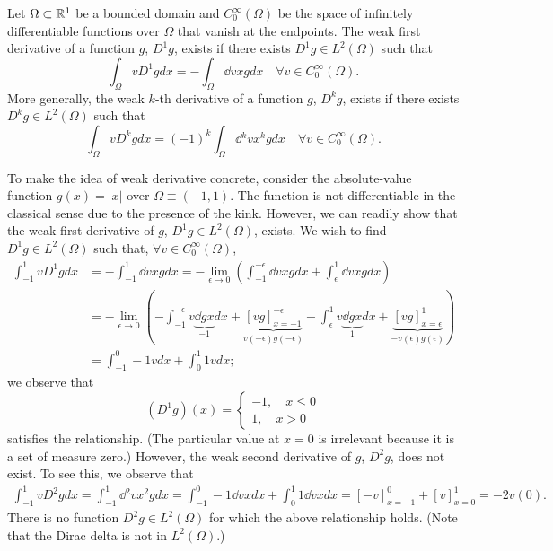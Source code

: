 \begin{definition}
  Let $\Omega \subset \mathbb{R}^1$ be a bounded domain and $C^\infty_0(\Omega)$ be the space of infinitely differentiable functions over $\Omega$ that vanish at the endpoints. The weak first derivative of a function $g$, $D^1g$, exists if there exists $D^1g \in L^2(\Omega)$ such that
\begin{equation*}
  \int_\Omega v D^1 g dx = - \int_\Omega \dd{v}{x} g dx \quad \forall v \in C^\infty_0(\Omega).
\end{equation*}
More generally, the weak $k$-th derivative of a function $g$, $D^kg$, exists if there exists $D^kg \in L^2(\Omega)$ such that
\begin{equation*}
  \int_\Omega v D^k g dx = (-1)^k \int_\Omega \dd{^kv}{x^k} g dx \quad \forall v \in C^\infty_0(\Omega).
\end{equation*}
\end{definition}

To make the idea of weak derivative concrete, consider the absolute-value function $g(x) = |x|$ over $\Omega \equiv (-1,1)$.  The function is not differentiable in the classical sense due to the presence of the kink.  However, we can readily show that the weak first derivative of $g$, $D^1g \in L^2(\Omega)$, exists.  We wish to find $D^1 g \in L^2(\Omega)$ such that, $\forall v \in C^\infty_0(\Omega)$, 
\begin{align*}
  \int_{-1}^1 v D^1 g dx
  &=
  - \int_{-1}^1 \dd{v}{x} g dx
  =
  - \lim_{\epsilon \to 0} ( \int_{-1}^{-\epsilon} \dd{v}{x} g dx
  + \int_{\epsilon}^1 \dd{v}{x} g dx )
  \\
  &=
  - \lim_{\epsilon \to 0} (-\int_{-1}^{-\epsilon} v \underbrace{ \dd{g}{x} }_{-1}dx + \underbrace{[vg]_{x=-1}^{-\epsilon}}_{v(-\epsilon)g(-\epsilon)}
  - \int_{\epsilon}^1 v \underbrace{ \dd{g}{x} }_{1} dx + \underbrace{[vg]_{x=\epsilon}^1}_{-v(\epsilon)g(\epsilon)} )
  \\
  &=
   \int_{-1}^{0} -1 v  dx +  \int_{0}^1 1 v dx;  %
\end{align*}
we observe that 
\begin{equation*}
  (D^1 g)(x) = \begin{cases}
    -1, \quad x \leq 0 \\
    1, \quad x > 0
  \end{cases}
\end{equation*}
satisfies the relationship. (The particular value at $x = 0$ is irrelevant because it is a set of measure zero.) However, the weak second derivative of $g$, $D^2g$, does not exist. To see this, we observe that
\begin{align*}
  \int_{-1}^1 v D^2 g dx
  =
  \int_{-1}^1 \dd{^2v}{x^2} g dx
  =
  \int_{-1}^0 -1 \dd{v}{x} dx + \int_{0}^1 1 \dd{v}{x} dx
  =
  [-v]_{x=-1}^0 + [v]_{x=0}^1
  =
  -2v(0).
\end{align*}
There is no function $D^2g \in L^2(\Omega)$ for which the above relationship holds.  (Note that the Dirac delta is not in $L^2(\Omega)$.)  %

